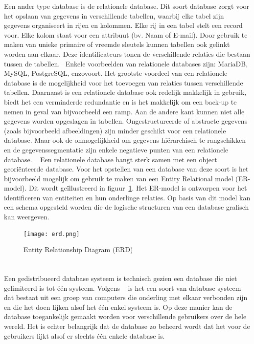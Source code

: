 Een ander type database is de relationele database. Dit soort database zorgt voor het opslaan van gegevens in verschillende tabellen, waarbij elke tabel zijn gegevens organiseert in rijen en kolommen. Elke rij in een tabel stelt een record voor. Elke kolom staat voor een attribuut (bv. Naam of E-mail). Door gebruik te maken van unieke primaire of vreemde sleutels kunnen tabellen ook gelinkt worden aan elkaar. Deze identificateurs tonen de verschillende relaties die bestaan tussen de tabellen.~\autocite{ibm} Enkele voorbeelden van relationele databases zijn:  MariaDB, MySQL, PostgreSQL, enzovoort. Het grootste voordeel van een relationele database is de mogelijkheid voor het toevoegen van relaties tussen verschillende tabellen. Daarnaast is een relationele database ook redelijk makkelijk in gebruik, biedt het een verminderde redundantie en is het makkelijk om een back-up te nemen in geval van bijvoorbeeld een ramp.  Aan de andere kant kunnen niet alle gegevens worden opgeslagen in tabellen. Ongestructureerde of abstracte gegevens (zoals bijvoorbeeld afbeeldingen) zijn minder geschikt voor een relationele database. Maar ook de onmogelijkheid om gegevens hiërarchisch te rangschikken en de gegevenssegmentatie zijn enkele negatieve punten van een relationele database. ~\autocite{ovhcloud} Een relationele database hangt sterk samen met een object georiënteerde database. Voor het opstellen van een database van deze soort is het bijvoorbeeld mogelijk om gebruik te maken van een Entity Relational model (ER-model). Dit wordt geïllustreerd in figuur~\ref{fig:erd}.
 Het ER-model is ontworpen voor het identificeren van entiteiten en hun onderlinge relaties. Op basis van dit model kan een schema opgesteld worden die de logische structuren van een database grafisch kan weergeven. ~\autocite{lucidchart}
 \begin{figure}[H]
     \centering
     \texttt{[image: erd.png]}
     \caption[Entity Relationship Diagram (ERD)]{Entity Relationship Diagram (ERD) ~\autocite{lucidchart}}
     \label{fig:erd}
 \end{figure}



\section{}%
\label{sec:gedistribueerde-databases}

Een gedistribueerd database systeem is technisch gezien een database die niet gelimiteerd is tot één systeem. Volgens ~\textcite{DistributedDatabase2022} is het een soort van database systeem dat bestaat uit een groep van computers die onderling met elkaar verbonden zijn en die het doen lijken alsof het één enkel systeem is. Op deze manier kan de database toegankelijk gemaakt worden voor verschillende gebruikers over de hele wereld. Het is echter belangrijk dat de database zo beheerd wordt dat het voor de gebruikers lijkt alsof er slechts één enkele database is. 

